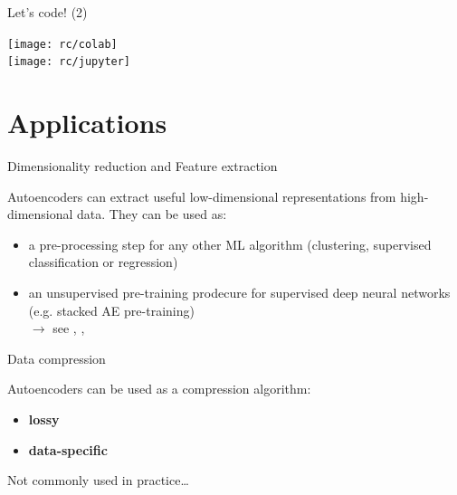 \documentclass[handout]{beamer}
\begin{document}
  \begin{frame}{Let's code! (2)}

    \centering
    \texttt{[image: rc/colab]}\\
    \vspace{1cm}
    \texttt{[image: rc/jupyter]}


    
  \end{frame}

  \section{Applications}

  \begin{frame}{Dimensionality reduction and Feature extraction}

    Autoencoders can extract useful low-dimensional representations from high-dimensional data. They can be used as:
    \pause
    \begin{itemize}
      \item[$\blacktriangleright$]<2-> a pre-processing step for any other ML algorithm (clustering, supervised classification or regression)
      \item[$\blacktriangleright$]<3-> an unsupervised pre-training prodecure for supervised deep neural networks (e.g. stacked AE pre-training)\\
      $\rightarrow$ see \cite{Hinton2006}, \cite{Erhan2010}, \cite{Vincent2010}
    \end{itemize}
    
  \end{frame}

  \begin{frame}{Data compression}
    
    Autoencoders can be used as a compression algorithm:
    \pause
    \begin{itemize}
      \item[$\blacktriangleright$] \textbf{lossy}
      \pause 
      \item[$\blacktriangleright$] \textbf{data-specific}
    \end{itemize}
    \pause
    Not commonly used in practice\dots

  \end{frame}  
\end{document}

